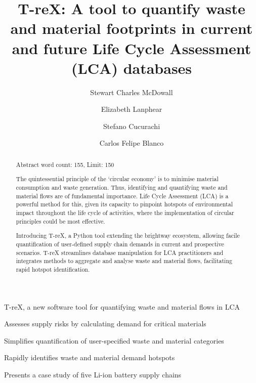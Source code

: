 \documentclass[review,3p,authoryear]{elsarticle}
\newcommand{\cbox}[1]{
    \begin{tcolorbox}[hbox, colback=red!5!white, colframe=red!65!black, boxrule=0.25pt, boxsep=2pt, left=2pt, right=2pt, top=1pt, bottom=1pt]
        \small\sffamily #1
    \end{tcolorbox}
}
\begin{document}
\begin{highlights}
    \item T-reX, a new software tool for quantifying waste and material flows in LCA
    \item Assesses supply risks by calculating demand for critical materials
    \item Simplifies quantification of user-specified waste and material categories
    \item Rapidly identifies waste and material demand hotspots
    \item Presents a case study of five Li-ion battery supply chains
\end{highlights}


\begin{frontmatter}

    \title{T-reX: A tool to quantify waste and material footprints in current and future Life Cycle Assessment (LCA) databases}
    \author[1]{Stewart Charles McDowall}
    \author[1]{Elizabeth Lanphear}
    \author[1]{Stefano Cucurachi}
    \author[1]{Carlos Felipe Blanco}



    \begin{abstract}
        \cbox{Abstract word count: 155, Limit: 150}
        The quintessential principle of the `circular economy' is to minimise material consumption and waste generation.
        Thus, identifying and quantifying waste and material flows are of fundamental importance. Life Cycle Assessment (LCA) is a powerful method for this, given its capacity to pinpoint hotspots of environmental impact throughout the life cycle of activities, where the implementation of circular principles could be most effective.

        Introducing T-reX, a Python tool extending the brightway ecosystem, allowing facile quantification of user-defined supply chain demands in current and prospective scenarios. T-reX streamlines database manipulation for LCA practitioners and integrates methods to aggregate and analyse waste and material flows, facilitating rapid hotspot identification.


\end{abstract}
\end{frontmatter}
\end{document}
